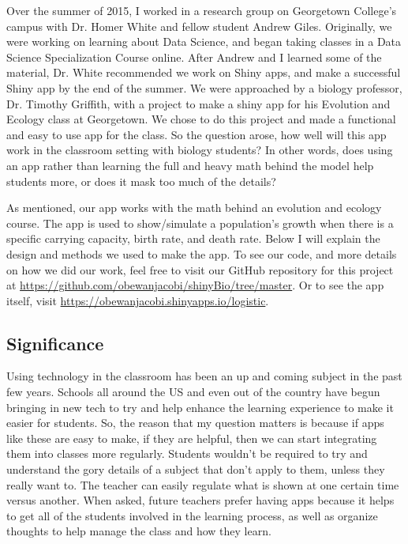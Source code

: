 \documentclass[titlepage]{article}\usepackage[]{graphicx}\usepackage[]{color}
\begin{document}
Over the summer of 2015, I worked in a research group on Georgetown College's campus with Dr. Homer White and fellow student Andrew Giles. Originally, we were working on learning about Data Science, and began taking classes in a Data Science Specialization Course online. After Andrew and I learned some of the material, Dr. White recommended we work on Shiny apps, and make a successful Shiny app by the end of the summer. We were approached by a biology professor, Dr. Timothy Griffith, with a project to make a shiny app for his Evolution and Ecology class at Georgetown. We chose to do this project and made a functional and easy to use app for the class. So the question arose, how well will this app work in the classroom setting with biology students? In other words, does using an app rather than learning the full and heavy math behind the model help students more, or does it mask too much of the details?

As mentioned, our app works with the math behind an evolution and ecology course. The app is used to show/simulate a population's growth when there is a specific carrying capacity, birth rate, and death rate. Below I will explain the design and methods we used to make the app. To see our code, and more details on how we did our work, feel free to visit our GitHub repository for this project at \url{https://github.com/obewanjacobi/shinyBio/tree/master}. Or to see the app itself, visit \url{https://obewanjacobi.shinyapps.io/logistic}.

\subsection{Significance}

Using technology in the classroom has been an up and coming subject in the past few years. Schools all around the US and even out of the country have begun bringing in new tech to try and help enhance the learning experience to make it easier for students. So, the reason that my question matters is because if apps like these are easy to make, if they are helpful, then we can start integrating them into classes more regularly. Students wouldn't be required to try and understand the gory details of a subject that don't apply to them, unless they really want to. The teacher can easily regulate what is shown at one certain time versus another. When asked, future teachers prefer having apps because it helps to get all of the students involved in the learning process, as well as organize thoughts to help manage the class and how they learn.
\end{document}

